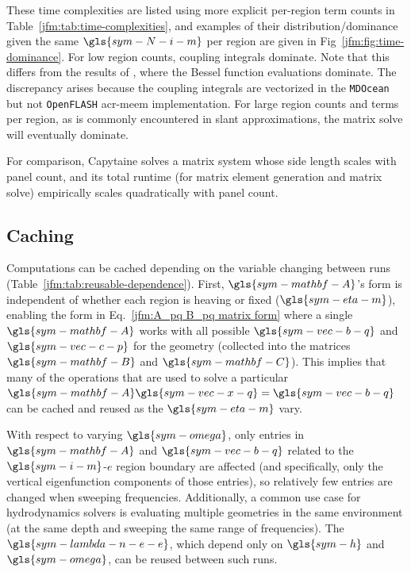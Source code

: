 \documentclass[lineno]{JFM-FLM_Au}
\begin{document}
These time complexities are listed using more explicit per-region term counts in Table~\ref{jfm:tab:time-complexities}, and examples of their distribution/dominance given the same $\gls{sym-N-i-m}$ per region are given in Fig~\ref{jfm:fig:time-dominance}.
For low region counts, coupling integrals dominate.
\ifdefined\DISSERTATION
Note that this differs from the results of , where the Bessel function evaluations dominate.
The discrepancy arises because the coupling integrals are vectorized in the \texttt{MDOcean} but not \texttt{OpenFLASH} \gls{acr-meem} implementation.
\fi
For large region counts and terms per region, as is commonly encountered in slant approximations, the matrix solve will eventually dominate.

For comparison, Capytaine solves a matrix system whose side length scales with panel count, and its total runtime (for matrix element generation and matrix solve) empirically scales quadratically with panel count.

\subsection{Caching}
Computations can be cached depending on the variable changing between runs (Table~\ref{jfm:tab:reusable-dependence}).
First, $\gls{sym-mathbf-A}$'s form is independent of whether each region is heaving or fixed ($\gls{sym-eta-m}$),
enabling the form in Eq.~\ref{jfm:A_pq B_pq matrix form} where a single $\gls{sym-mathbf-A}$ works with all possible $\gls{sym-vec-b-q}$ and $\gls{sym-vec-c-p}$ for the geometry
(collected into the matrices $\gls{sym-mathbf-B}$ and $\gls{sym-mathbf-C}$).
This implies that many of the operations that are used to solve a particular
$\gls{sym-mathbf-A}\gls{sym-vec-x-q} = \gls{sym-vec-b-q}$
can be cached and reused as the $\gls{sym-eta-m}$ vary.

With respect to varying $\gls{sym-omega}$, only entries in $\gls{sym-mathbf-A}$ and $\gls{sym-vec-b-q}$ related to the $\gls{sym-i-m}$-$e$ region boundary are affected (and specifically, only the vertical eigenfunction components of those entries), so relatively few entries are changed when sweeping frequencies.
Additionally, a common use case for hydrodynamics solvers is evaluating multiple geometries in the same environment (at the same depth and sweeping the same range of frequencies).
The $\gls{sym-lambda-n-e-e}$, which depend only on $\gls{sym-h}$ and $\gls{sym-omega}$, can be reused between such runs.
\end{document}
